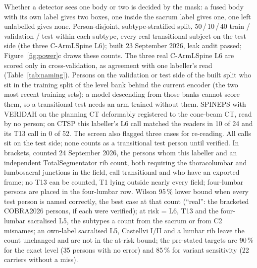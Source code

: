 \begin{table}[p]
{\begin{minipage}{23.2cm}
Whether a detector sees one body or two is decided by the mask: a fused body with its own label gives two boxes, one inside the sacrum label gives one, one left unlabelled gives none.
Person-disjoint, subtype-stratified split, 50\,/\,10\,/\,40 train / validation / test within each subtype, every real transitional subject on the test side (the three C-ArmLSpine L6); built 23 September 2026, leak audit passed; Figure~\ref{fig:power}c draws these counts. The three real C-ArmLSpine L6 are scored only in cross-validation, as agreement with one labeller's read (Table~\ref{tab:naming}).
Persons on the validation or test side of the built split who sit in the training split of the level bank behind the current encoder (the two most recent training sets); a model descending from those banks cannot score them, so a transitional test needs an arm trained without them.
SPINEPS with VERIDAH on the planning CT deformably registered to the cone-beam CT, read by no person; on CTSP this labeller's L6 call matched the readers in 10 of 24 and its T13 call in 0 of 52. The screen also flagged three cases for re-reading. All calls sit on the test side; none counts as a transitional test person until verified. In brackets, counted 24 September 2026, the persons whom this labeller and an independent TotalSegmentator rib count, both requiring the thoracolumbar and lumbosacral junctions in the field, call transitional and who have an exported frame; no T13 can be counted, T1 lying outside nearly every field; four-lumbar persons are placed in the four-lumbar row.
Wilson 95\,\% lower bound when every test person is named correctly, the best case at that count (``real'': the bracketed COBRA2026 persons, if each were verified); at risk = L6, T13 and the four-lumbar sacralised L5, the subtypes a count from the sacrum or from C2 misnames; an own-label sacralised L5, Castellvi I/II and a lumbar rib leave the count unchanged and are not in the at-risk bound; the pre-stated targets are 90\,\% for the exact level (35 persons with no error) and 85\,\% for variant sensitivity (22 carriers without a miss).
\par\endgroup
\end{minipage}}
\endgroup
\end{table}
